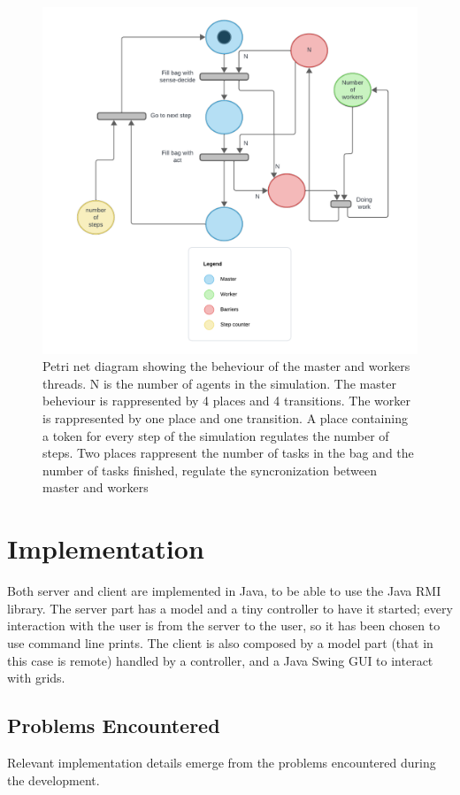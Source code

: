\documentclass[12pt, a4paper]{report}
\begin{document}
\begin{figure}
    \centering
    \includegraphics{PetriNetColored.png}
    \caption{Petri net diagram showing the beheviour of the master and workers threads. N is the number of agents in the simulation. The master beheviour is rappresented by 4 places and 4 transitions. The worker is rappresented by one place and one transition. A place containing a token for every step of the simulation regulates the number of steps. Two places rappresent the number of tasks in the bag and the number of tasks finished, regulate the syncronization between master and workers}
\end{figure}

\chapter{Implementation}
Both server and client are implemented in Java, to be able to use the Java RMI
 library. The server part has a model and a tiny controller to have it started;
 every interaction with the user is from the server to the user, so it has been
 chosen to use command line prints. The client is also composed by a model part
 (that in this case is remote) handled by a controller, and a Java Swing GUI to
 interact with grids.

\section{Problems Encountered}
Relevant implementation details emerge from the problems encountered during the
 development.
\end{document}
